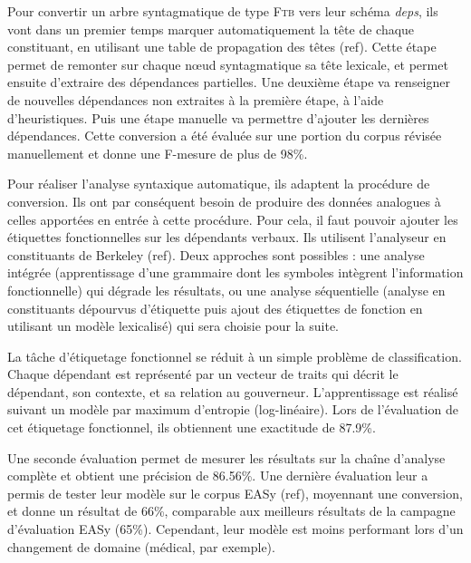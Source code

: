 \documentclass[a4paper,12pt]{article}
\begin{document}
Pour convertir un arbre syntagmatique de type \textsc{Ftb} vers leur schéma \textit{deps}, ils vont dans un premier temps marquer automatiquement la tête de chaque constituant, en utilisant une table de propagation des têtes (ref). Cette étape permet de remonter sur chaque n\oe{}ud syntagmatique sa tête lexicale, et permet ensuite d'extraire des dépendances partielles. Une deuxième étape va renseigner de nouvelles dépendances non extraites à la première étape, à l'aide d'heuristiques. Puis une étape manuelle va permettre d'ajouter les dernières dépendances. Cette conversion a été évaluée sur une portion du corpus révisée manuellement et donne une F-mesure de plus de 98\%.

Pour réaliser l'analyse syntaxique automatique, ils adaptent la procédure de conversion. Ils ont par conséquent besoin de produire des données analogues à celles apportées en entrée à cette procédure. Pour cela, il faut pouvoir ajouter les étiquettes fonctionnelles sur les dépendants verbaux. Ils utilisent l'analyseur en constituants de Berkeley (ref). Deux approches sont possibles : une analyse intégrée (apprentissage d'une grammaire dont les symboles intègrent l'information fonctionnelle) qui dégrade les résultats, ou une analyse séquentielle (analyse en constituants dépourvus d'étiquette puis ajout des étiquettes de fonction en utilisant un modèle lexicalisé) qui sera choisie pour la suite.

La tâche d'étiquetage fonctionnel se réduit à un simple problème de classification. Chaque dépendant est représenté par un vecteur de traits qui décrit le dépendant, son contexte, et sa relation au gouverneur. L'apprentissage est réalisé suivant un modèle par maximum d'entropie (log-linéaire). Lors de l'évaluation de cet étiquetage fonctionnel, ils obtiennent une exactitude de 87.9\%.

Une seconde évaluation permet de mesurer les résultats sur la chaîne d'analyse complète et obtient une précision de 86.56\%. Une dernière évaluation leur a permis de tester leur modèle sur le corpus EASy (ref), moyennant une conversion, et donne un résultat de 66\%, comparable aux meilleurs résultats de la campagne d'évaluation EASy (65\%). Cependant, leur modèle est moins performant lors d'un changement de domaine (médical, par exemple).
\end{document}
